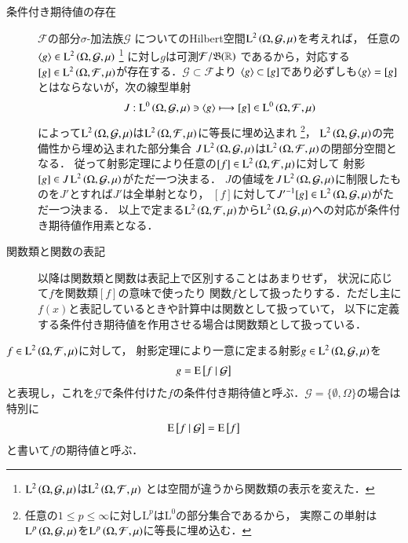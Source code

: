 \begin{description}
	\item[条件付き期待値の存在]
		$\mathcal{F}$の部分$\sigma$-加法族$\mathcal{G}$
		についてのHilbert空間$\operatorname{L}^{2} \left(\Omega, \mathcal{G},\mu\right)$を考えれば，
		任意の$\inprod<g> \in \Lp{2}{\Omega, \mathcal{G},\mu}$
		\footnote{
			$\operatorname{L}^{2} \left(\Omega, \mathcal{G},\mu\right)$は$\operatorname{L}^{2} \left(\Omega, \mathcal{F},\mu\right)$
			とは空間が違うから関数類の表示を変えた．
		}
		に対し$g$は可測$\mathcal{F}/\mathfrak{B}(\mathbb{R})$
		であるから，対応する$[g] \in \operatorname{L}^{2} \left(\Omega, \mathcal{F},\mu\right)$が存在する．$\mathcal{G} \subset \mathcal{F}$より
		$\inprod<g> \subset [g]$であり必ずしも$\inprod<g> = [g]$とはならないが，次の線型単射
		\begin{align}
			J:\Lp{0}{\Omega, \mathcal{G},\mu} \ni \inprod<g> \longmapsto [g] \in \Lp{0}{\Omega, \mathcal{F},\mu}
			\label{eq:Lp_sp_embedding}
		\end{align}
		によって$\operatorname{L}^{2} \left(\Omega, \mathcal{G},\mu\right)$は$\operatorname{L}^{2} \left(\Omega, \mathcal{F},\mu\right)$に等長に埋め込まれ
		\footnote{
			任意の$1 \leq p \leq \infty$に対し$\mathrm{L}^{p}$は$\mathrm{L}^{0}$の部分集合であるから，
			実際この単射は$\operatorname{L}^{p} \left(\Omega, \mathcal{G},\mu\right)$を$\operatorname{L}^{p} \left(\Omega, \mathcal{F},\mu\right)$に等長に埋め込む．
		}，
		$\operatorname{L}^{2} \left(\Omega, \mathcal{G},\mu\right)$の完備性から埋め込まれた部分集合
		$J\operatorname{L}^{2} \left(\Omega, \mathcal{G},\mu\right)$は$\operatorname{L}^{2} \left(\Omega, \mathcal{F},\mu\right)$の閉部分空間となる．
		従って射影定理により任意の$[f] \in \operatorname{L}^{2} \left(\Omega, \mathcal{F},\mu\right)$に対して
		射影$[g] \in J\operatorname{L}^{2} \left(\Omega, \mathcal{G},\mu\right)$がただ一つ決まる．
		$J$の値域を$J\operatorname{L}^{2} \left(\Omega, \mathcal{G},\mu\right)$に制限したものを$J'$とすれば$J'$は全単射となり，
		$[f]$に対して${J'}^{-1}[g] \in \operatorname{L}^{2} \left(\Omega, \mathcal{G},\mu\right)$がただ一つ決まる．
		以上で定まる$\operatorname{L}^{2} \left(\Omega, \mathcal{F},\mu\right)$から$\operatorname{L}^{2} \left(\Omega, \mathcal{G},\mu\right)$への対応が条件付き期待値作用素となる．
		
	\item[関数類と関数の表記]
		以降は関数類と関数は表記上で区別することはあまりせず，
		状況に応じて$f$を関数類$[f]$の意味で使ったり
		関数$f$として扱ったりする．ただし主に$f(x)$と表記しているときや計算中は関数として扱っていて，
		以下に定義する条件付き期待値を作用させる場合は関数類として扱っている．
	\end{description}
	
	\begin{itembox}[l]{}
		\begin{dfn}
			$f \in \operatorname{L}^{2} \left(\Omega, \mathcal{F},\mu\right)$に対して，
			射影定理により一意に定まる射影$g \in \operatorname{L}^{2} \left(\Omega, \mathcal{G},\mu\right)$を
			\begin{align}
				g = \operatorname{E} \left[ f \ \middle|\ \mathcal{G} \right]
			\end{align}
			と表現し，これを$\mathcal{G}$で条件付けた$f$の条件付き期待値と呼ぶ．$\mathcal{G} = \{\emptyset, \Omega\}$の場合は特別に
			\begin{align}
				\operatorname{E} \left[ f \ \middle|\ \mathcal{G} \right] = \operatorname{E} \left[ f \right]
			\end{align}
			と書いて$f$の期待値と呼ぶ．
		\end{dfn}
	\end{itembox}
	
